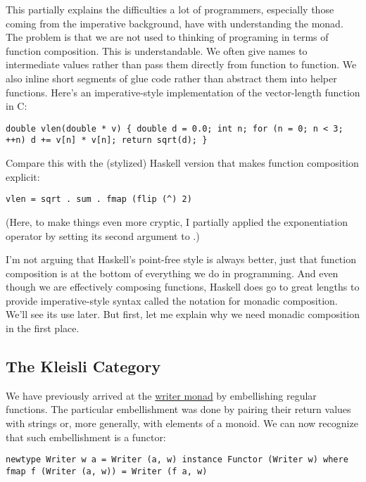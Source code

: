 This partially explains the difficulties a lot of programmers,
especially those coming from the imperative background, have with
understanding the monad. The problem is that we are not used to thinking
of programing in terms of function composition. This is understandable.
We often give names to intermediate values rather than pass them
directly from function to function. We also inline short segments of
glue code rather than abstract them into helper functions. Here's an
imperative-style implementation of the vector-length function in C:

\begin{verbatim}
double vlen(double * v) { double d = 0.0; int n; for (n = 0; n < 3; ++n) d += v[n] * v[n]; return sqrt(d); }
\end{verbatim}

Compare this with the (stylized) Haskell version that makes function
composition explicit:

\begin{verbatim}
vlen = sqrt . sum . fmap (flip (^) 2)
\end{verbatim}

(Here, to make things even more cryptic, I partially applied the
exponentiation operator \code{(\^{})} by setting its second argument
to .)

I'm not arguing that Haskell's point-free style is always better, just
that function composition is at the bottom of everything we do in
programming. And even though we are effectively composing functions,
Haskell does go to great lengths to provide imperative-style syntax
called the  notation for monadic composition. We'll see its
use later. But first, let me explain why we need monadic composition in
the first place.

\subsection{The Kleisli Category}\label{the-kleisli-category}

We have previously arrived at the
\href{https://bartoszmilewski.com/2014/12/23/kleisli-categories/}{writer
monad} by embellishing regular functions. The particular embellishment
was done by pairing their return values with strings or, more generally,
with elements of a monoid. We can now recognize that such embellishment
is a functor:

\begin{verbatim}
newtype Writer w a = Writer (a, w) instance Functor (Writer w) where fmap f (Writer (a, w)) = Writer (f a, w)
\end{verbatim}

